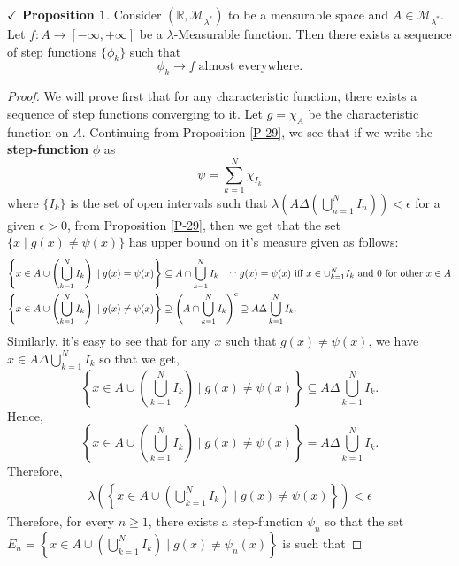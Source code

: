 \documentclass{article}
\theoremstyle{definition}
\theoremstyle{remark}
\theoremstyle{definition}
\theoremstyle{definition}
\newtheorem{proposition}{$\checkmark$ Proposition}
\theoremstyle{definition}
\newcommand{\union}{\cup}
\newcommand{\intrs}{\cap}
\newcommand{\bunion}{\bigcup}
\newcommand{\where}{\;\vert\;}
\newcommand{\R}{\mathbb{R}}
\newcommand{\set}[1]{\mathscr{#1}}
\newcommand{\msigm}[1]{\set{M}_{#1}}
\newcommand{\lm}[1]{\lambda\left (#1\right )}
\begin{document}
\hrulefill
\begin{proposition}
		Consider $ (\R,\msigm{\lambda^*}) $ to be a measurable space and $ A\in \msigm{\lambda^*} $. Let $ f : A\to [-\infty,+\infty] $ be a $ \lambda $-Measurable function. Then there exists a sequence of step functions $ \{\phi_k\} $ such that
		\[\phi_k \longrightarrow f\;\text{almost everywhere.}\]
\end{proposition}
\begin{proof}
		We will prove first that for any characteristic function, there exists a sequence of step functions converging to it. Let $ g = \chi_A $ be the characteristic function on $ A $. Continuing from Proposition \ref{P-29}, we see that if we write the \textbf{step-function }$ \phi $ as
		\[\psi = \sum_{k=1}^{N} \chi_{I_k}\]
		where $ \{I_k\} $ is the set of open intervals such that $ \lm{A \Delta \left (\bunion_{n=1}^{N} I_n\right )} < \epsilon$ for a given $ \epsilon > 0 $, from Proposition \ref{P-29}, then we get that the set $ \{x\where g(x) \neq \psi(x)\} $ has upper bound on it's measure given as follows:
		\begin{equation*}
			\begin{split}
				\left \{x\in A \union \left (\bunion_{k=1}^{N} I_k\right )\where g(x) = \psi(x)\right \} &\subseteq A \intrs \bunion_{k=1}^{N} I_k \;\;\;\;\text{$ \because $ $ g(x) = \psi(x) $ iff $ x\in \union_{k=1}^{N} I_k$ and $ 0 $ for other $ x \in A $}\\
				\left \{x\in A \union \left (\bunion_{k=1}^{N} I_k\right )\where g(x)\neq \psi(x)\right \}&\supseteq \left (A \intrs \bunion_{k=1}^{N} I_k\right )^{\text{c}}\supseteq A \Delta \bunion_{k=1}^{N} I_k.
			\end{split}
		\end{equation*}
	Similarly, it's easy to see that for any $ x $ such that $ g(x) \neq \psi(x) $, we have $ x \in A\Delta \bunion_{k=1}^{N} I_k $ so that we get,
	\[	\left \{x\in A \union \left (\bunion_{k=1}^{N} I_k\right )\where g(x) \neq \psi(x)\right \}\subseteq A \Delta \bunion_{k=1}^{N} I_k.\]
	Hence, 
	\[	\left \{x\in A \union \left (\bunion_{k=1}^{N} I_k\right )\where g(x) \neq \psi(x)\right \} = A\Delta \bunion_{k=1}^{N} I_k .\]
	Therefore, 
	\begin{equation*}
		\begin{split}
			\lm{	\left \{x\in A \union \left (\bunion_{k=1}^{N} I_k\right )\where g(x) \neq \psi(x)\right \}} < \epsilon
		\end{split}
	\end{equation*}
Therefore, for every $ n\ge 1 $, there exists a step-function $ \psi_n $ so that the set $ E_n = 	\left \{x\in A \union \left (\bunion_{k=1}^{N} I_k\right )\where g(x) \neq \psi_n(x)\right \} $ is such that

\end{proof}
\end{document}
